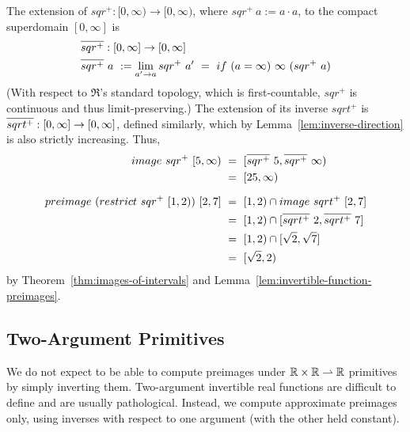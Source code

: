 \begin{example}
The extension of $sqr^+ : [0,\infty) \to [0,\infty)$, where $sqr^+~a := a \cdot a$, to the compact superdomain $[0,\infty]$ is
\begin{equation}
\begin{aligned}
	&\cl{sqr^+} : [0,\infty] \to [0,\infty] \\
	&	\cl{sqr^+}~a\ := \lim_{a' \to a} sqr^+~a'
		\ =\ if~(a = \infty)~{\infty}~(sqr^+~a)
\end{aligned}
\end{equation}
(With respect to $\Re$'s standard topology, which is first-countable, $sqr^+$ is continuous and thus limit-preserving.)
The extension of its inverse $sqrt^+$ is $\cl{sqrt^+} : [0,\infty] \to [0,\infty]$, defined similarly, which by Lemma~\ref{lem:inverse-direction} is also strictly increasing.
Thus,
\begin{equation}
\begin{aligned}
	image~sqr^+~[5,\infty)\ &=\ [\cl{sqr^+}~5,\cl{sqr^+}~{\infty})
\\
		\ &=\ [25,\infty)
\\[6pt]
	preimage~(restrict~sqr^+~[1,2))~[2,7]
		\ &=\ [1,2) \i image~sqrt^+~[2,7]
\\
		\ &=\ [1,2) \i [\cl{sqrt^+}~2,\cl{sqrt^+}~7]
\\
		\ &=\ [1,2) \i [\sqrt{2},\sqrt{7}]
\\
		\ &=\ [\sqrt{2},2)
\end{aligned}
\end{equation}
by Theorem~\ref{thm:images-of-intervals} and Lemma~\ref{lem:invertible-function-preimages}.
\exampleqed
\end{example}


\subsection{Two-Argument Primitives}

We do not expect to be able to compute preimages under $\mathbb{R} \times \mathbb{R} \rightharpoonup \mathbb{R}$ primitives by simply inverting them.
Two-argument invertible real functions are difficult to define and are usually pathological.
Instead, we compute approximate preimages only, using inverses with respect to one argument (with the other held constant).

